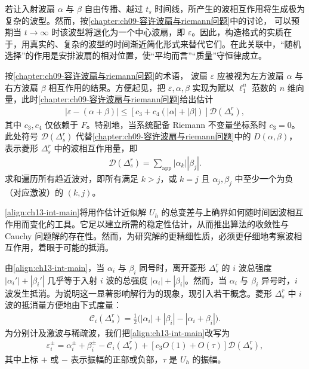 \documentclass[../../main.tex]{subfiles}
\begin{document}
若让入射波扇 $\alpha$ 与 $\beta$ 自由传播、越过 $t_s$ 时间线，所产生的波相互作用将生成极为复杂的波型。然而，按\cref{chapter:ch09-容许波扇与riemann问题}中的讨论，
可以预期当 $t\to\infty$ 时该波型将退化为一个中心波扇，即 $\varepsilon$。因此，构造格式的实质在于，用真实的、复杂的波型的时间渐近简化形式来替代它们。在此关联中，``随机选择''的作用是安排波扇的相对位置，使``平均而言''``质量''守恒律成立。

按\cref{chapter:ch09-容许波扇与riemann问题}的术语，
波扇 $\varepsilon$ 应被视为左方波扇 $\alpha$ 与右方波扇 $\beta$ 相互作用的结果。方便起见，把 $\varepsilon,\alpha,\beta$ 实现为赋以 $\ell_1^n$ 范数的 $n$ 维向量，此时\cref{chapter:ch09-容许波扇与riemann问题}给出估计
\begin{align}
|\varepsilon-(\alpha+\beta)|\leqslant[c_3+c_4(|\alpha|+|\beta|)]\mathscr{D}(\Delta_s^r),
\label{align:ch13-int-main}
\end{align}
其中 $c_3,c_4$ 仅依赖于 $F$。特别地，当系统配备 Riemann 不变量坐标系时 $c_3=0$。此处符号 $\mathscr{D}(\Delta_s^r)$ 代替\cref{chapter:ch09-容许波扇与riemann问题}中的 $D(\alpha,\beta)$，
表示菱形 $\Delta_s^r$ 中的波相互作用量，即
\begin{align}
\mathscr{D}(\Delta_s^r)=\sum_{\mathrm{app}}|\alpha_k||\beta_j|.
\label{align:ch13-D-def}
\end{align}
求和遍历所有趋近波对，即所有满足 $k>j$，或 $k=j$ 且 $\alpha_j,\beta_j$ 中至少一个为负（对应激波）的 $(k,j)$。

\eqref{align:ch13-int-main}将用作估计近似解 $U_h$ 的总变差与上确界如何随时间因波相互作用而变化的工具。它足以建立所需的稳定性估计，从而推出算法的收敛性与 Cauchy 问题解的存在性。然而，为研究解的更精细性质，必须更仔细地考察波相互作用，着眼于可能的抵消。

由\eqref{align:ch13-int-main}，当 $\alpha_i$ 与 $\beta_i$ 同号时，离开菱形 $\Delta_s^r$ 的 $i$ 波总强度 $|\alpha_i'|+|\beta_i'|$ 几乎等于入射 $i$ 波的总强度 $|\alpha_i|+|\beta_i|$。然而，当 $\alpha_i$ 与 $\beta_i$ 异号时，$i$ 波发生抵消。为说明这一显著影响解行为的现象，现引入若干概念。菱形 $\Delta_s^r$ 中 $i$ 波的抵消量方便地由下式度量：
\begin{align}
\mathscr{C}_i(\Delta_s^r)=\frac12\big(|\alpha_i|+|\beta_i|-|\alpha_i+\beta_i|\big).
\label{align:ch13-Ci-def}
\end{align}
为分别计及激波与稀疏波，我们把\eqref{align:ch13-int-main}改写为
\begin{align}
\varepsilon_i^{\pm}=\alpha_i^{\pm}+\beta_i^{\pm}-\mathscr{C}_i(\Delta_s^r)+[c_3O(1)+O(\tau)]\mathscr{D}(\Delta_s^r),
\label{align:ch13-int-signed}
\end{align}
其中上标 $+$ 或 $-$ 表示振幅的正部或负部，$\tau$ 是 $U_h$ 的振幅。
\end{document}
